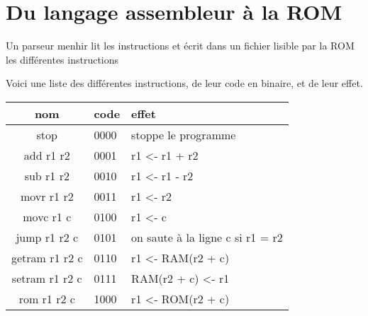 \documentclass[12pt,a4paper,french]{article}
\begin{document}
\section{Du langage assembleur à la ROM}

Un parseur menhir lit les instructions et écrit dans un fichier lisible par la ROM les différentes instructions

Voici une liste des différentes instructions, de leur code en binaire, et de leur effet.

\;



\begin{tabularx}{15cm}{|c|p{4cm}|X|}
    \hline
    nom & code & effet \\
    \hline
    stop & 0000 & stoppe le programme \\
    \hline
    add r1 r2 & 0001 & r1 <- r1 + r2 \\
    \hline
    sub r1 r2 & 0010 & r1 <- r1 - r2 \\
    \hline
    movr r1 r2 & 0011 & r1 <- r2 \\
    \hline
    movc r1 c & 0100 & r1 <- c \\
    \hline
    jump r1 r2 c & 0101 & on saute à la ligne c si r1 = r2 \\
    \hline
    getram r1 r2 c & 0110 & r1 <- RAM(r2 + c) \\
    \hline
    setram r1 r2 c & 0111 & RAM(r2 + c) <- r1 \\
    \hline
    rom r1 r2 c & 1000 & r1 <- ROM(r2 + c) \\
    \hline
\end{tabularx}
\end{document}
